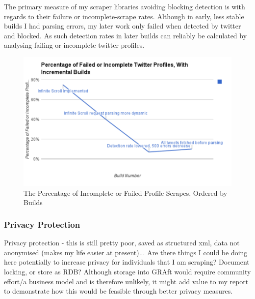 The primary measure of my scraper libraries avoiding blocking detection is with regards to their failure or incomplete-scrape rates. Although in early, less stable builds I had parsing errors, my later work only failed when detected by twitter and blocked. As such detection rates in later builds can reliably be calculated by analysing failing or incomplete twitter profiles. 

\begin{figure}[h!]
\centering
\includegraphics{Images/percentage_failed_incomplete_twitter_profiles.pdf}
\caption{The Percentage of Incomplete or Failed Profile Scrapes, Ordered by Builds}
\end{figure}

\subsubsection{Privacy Protection}

Privacy protection - this is still pretty poor, saved as structured xml, data not anonymised (makes my life easier at present)... Are there things I could be doing here potentially to increase privacy for individuals that I am scraping? Document locking, or store as RDB? Although storage into GRAft would require community effort/a business model and is therefore unlikely, it might add value to my report to demonstrate how this would be feasible through better privacy measures. 
